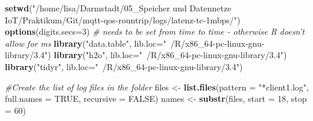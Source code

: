 \documentclass[]{article}
\newenvironment{Shaded}{\begin{snugshade}}{\end{snugshade}}
\newcommand{\KeywordTok}[1]{\textcolor[rgb]{0.13,0.29,0.53}{\textbf{#1}}}
\newcommand{\DataTypeTok}[1]{\textcolor[rgb]{0.13,0.29,0.53}{#1}}
\newcommand{\DecValTok}[1]{\textcolor[rgb]{0.00,0.00,0.81}{#1}}
\newcommand{\StringTok}[1]{\textcolor[rgb]{0.31,0.60,0.02}{#1}}
\newcommand{\CommentTok}[1]{\textcolor[rgb]{0.56,0.35,0.01}{\textit{#1}}}
\newcommand{\OtherTok}[1]{\textcolor[rgb]{0.56,0.35,0.01}{#1}}
\newcommand{\NormalTok}[1]{#1}
\begin{document}
\begin{Shaded}
\begin{Highlighting}[]
\KeywordTok{setwd}\NormalTok{(}\StringTok{"/home/lisa/Darmstadt/05_Speicher und Datennetze IoT/Praktikum/Git/mqtt-qos-rountrip/logs/latenz-tc-1mbps/"}\NormalTok{)}
\KeywordTok{options}\NormalTok{(}\DataTypeTok{digits.secs=}\DecValTok{3}\NormalTok{) }\CommentTok{# needs to be set from time to time - otherwise R doesn't allow for ms}
\KeywordTok{library}\NormalTok{(}\StringTok{"data.table"}\NormalTok{, }\DataTypeTok{lib.loc=}\StringTok{"~/R/x86_64-pc-linux-gnu-library/3.4"}\NormalTok{)}
\KeywordTok{library}\NormalTok{(}\StringTok{"h2o"}\NormalTok{, }\DataTypeTok{lib.loc=}\StringTok{"~/R/x86_64-pc-linux-gnu-library/3.4"}\NormalTok{)}
\KeywordTok{library}\NormalTok{(}\StringTok{"tidyr"}\NormalTok{, }\DataTypeTok{lib.loc=}\StringTok{"~/R/x86_64-pc-linux-gnu-library/3.4"}\NormalTok{)}

\CommentTok{#Create the list of log files in the folder}
\NormalTok{files <-}\StringTok{ }\KeywordTok{list.files}\NormalTok{(}\DataTypeTok{pattern =} \StringTok{"*client1.log"}\NormalTok{, }\DataTypeTok{full.names =} \OtherTok{TRUE}\NormalTok{, }\DataTypeTok{recursive =} \OtherTok{FALSE}\NormalTok{)}
\NormalTok{names <-}\StringTok{ }\KeywordTok{substr}\NormalTok{(files, }\DataTypeTok{start =} \DecValTok{18}\NormalTok{, }\DataTypeTok{stop =} \DecValTok{60}\NormalTok{)}
\end{Highlighting}
\end{Shaded}
\end{document}
